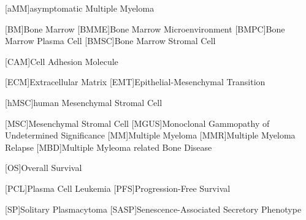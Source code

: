 
%
\label{sec:Abbreviations}%

{
    \small
    \begin{spacing}{.3}
        \begin{acronym}
            [aMM]{asymptomatic Multiple Myeloma}

            [BM]{Bone Marrow}
            [BMME]{Bone Marrow Microenvironment}
            [BMPC]{Bone Marrow Plasma Cell}
            [BMSC]{Bone Marrow Stromal Cell}

            [CAM]{Cell Adhesion Molecule}

            [ECM]{Extracellular Matrix}
            [EMT]{Epithelial-Mesenchymal Transition}

            [hMSC]{human Mesenchymal Stromal Cell}

            [MSC]{Mesenchymal Stromal Cell}
            [MGUS]{Monoclonal Gammopathy of Undetermined Significance}
            [MM]{Multiple Myeloma}
            [MMR]{Multiple Myeloma Relapse}
            [MBD]{Multiple Myleoma related Bone Disease}

            [OS]{Overall Survival}

            [PCL]{Plasma Cell Leukemia}
            [PFS]{Progression-Free Survival}

            [SP]{Solitary Plasmacytoma}
            [SASP]{Senescence-Associated Secretory Phenotype}


        \end{acronym}
    \end{spacing}
}